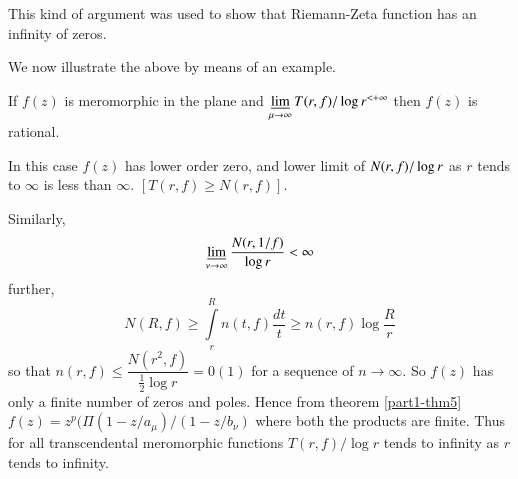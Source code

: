 This kind of argument was used to show that Riemann-Zeta function has
an infinity of zeros.

We now illustrate the above by means of an example.

If $f(z)$ is meromorphic in the plane and
$\mathop{\underline{\lim}}\limits_{\mu\to\infty}T(r,f)/\log r^{<+\infty}$
then $f(z)$ is rational.

In this case $f(z)$ has lower order zero, and lower limit of
$N(r,f)/\unskip\break\log r$ as $r$ tends to $\infty$ is less than
$\infty$. $[T(r,f)\geq N(r,f)]$.

Similarly,
$$
\mathop{\underline{\lim}}\limits_{\nu\to\infty}\frac{N(r,1/f)}{\log r}<\infty
$$
further,
$$
N(R,f)\geq \int\limits^{R}_{r}n(t,f)\frac{dt}{t}\geq
n(r,f)\log\frac{R}{r}
$$
so that $n(r,f)\leq \dfrac{N(r^{2},f)}{\frac{1}{2}\log r}=0(1)$ for a
sequence of $n\to \infty$. So $f(z)$ has only a finite number of zeros
and poles. Hence from theorem \ref{part1-thm5}\pageoriginale 
$f(z)=z^{p}(\Pi(1-z/a_{\mu})/(1-z/b_{\nu})$ where both the products are
finite. Thus for all transcendental meromorphic functions
$T(r,f)/\log r$ tends to infinity as $r$ tends to infinity.




